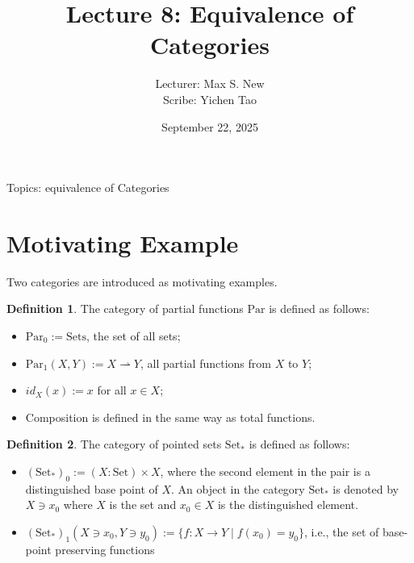 \documentclass[12pt]{article}
\theoremstyle{plain}
\theoremstyle{definition}
\newtheorem{definition}{Definition}
\theoremstyle{remark}
\newcommand{\Set}{\mathrm{Set}}
\newcommand{\PSet}{\mathrm{Set}_*}
\begin{document}
\title{Lecture 8: Equivalence of Categories}
\author{Lecturer: Max S. New\\ Scribe: Yichen Tao}
\date{September 22, 2025}
\maketitle


Topics: equivalence of Categories

\section{Motivating Example}

Two categories are introduced as motivating examples. 
\begin{definition}
    The category of partial functions $\mathrm {Par}$ is defined as follows:
    \begin{itemize}
        \item $\mathrm{Par}_0 := \text{Sets}$, the set of all sets;
        \item $\mathrm{Par}_1(X,Y) := X \rightharpoonup Y$, all partial functions from $X$ to $Y$;
        \item $id_X (x) := x$ for all $x\in X$;
        \item Composition is defined in the same way as total functions.
    \end{itemize}
\end{definition}

\begin{definition}
    The category of pointed sets $\mathrm{Set}_*$ is defined as follows:
    \begin{itemize}
        \item $(\mathrm{Set}_*)_0 := (X : \Set) \times X $, where the second element in the pair is a distinguished base point of $X$. An object in the category $\PSet$ is denoted by $X \ni x_0$ where $X$ is the set and $x_0\in X$ is the distinguished element.
        \item $(\PSet)_1(X\ni x_0, Y \ni y_0) := \{f : X \to Y \mid f(x_0) = y_0\}$, i.e., the set of base-point preserving functions
    \end{itemize}
\end{definition}
\end{document}
